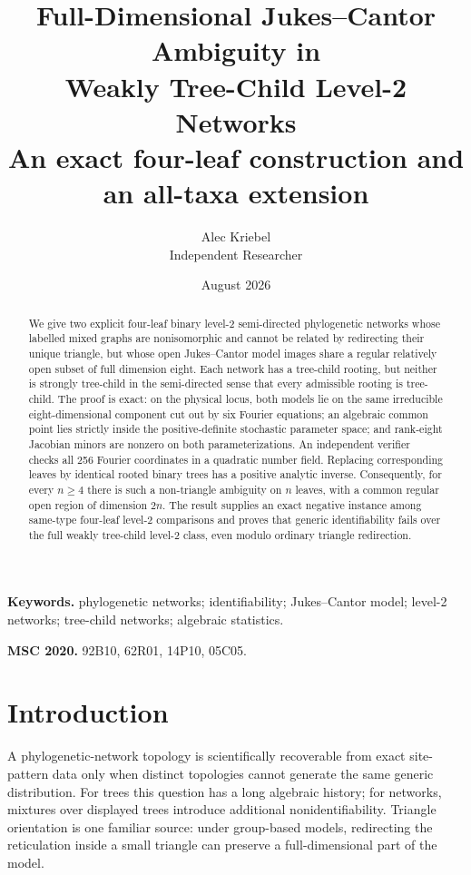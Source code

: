 \documentclass[11pt]{article}
\title{Full-Dimensional Jukes--Cantor Ambiguity in\\
Weakly Tree-Child Level-2 Networks\\
\large An exact four-leaf construction and an all-taxa extension}
\author{Alec Kriebel\\\small Independent Researcher}
\date{August 2026}
\theoremstyle{remark}
\begin{document}
\maketitle

\begin{abstract}
We give two explicit four-leaf binary level-2 semi-directed phylogenetic
networks whose labelled mixed graphs are nonisomorphic and cannot be related
by redirecting their unique triangle, but whose open Jukes--Cantor model
images share a regular relatively open subset of full dimension eight.  Each
network has a tree-child rooting, but neither is strongly tree-child in the
semi-directed sense that every admissible rooting is tree-child.  The proof is
exact: on the physical locus, both models lie on the same irreducible
eight-dimensional component cut out by six Fourier equations; an algebraic
common point lies
strictly inside the positive-definite stochastic parameter space; and
rank-eight Jacobian minors are nonzero on both parameterizations.  An
independent verifier checks all 256 Fourier coordinates in a quadratic number
field.  Replacing corresponding leaves by identical rooted binary trees has
a positive analytic inverse.  Consequently, for every $n\ge4$ there is such
a non-triangle ambiguity on $n$ leaves, with a common regular open region of
dimension $2n$.  The result supplies an exact negative instance among
same-type four-leaf level-2 comparisons and proves that generic identifiability
fails over the full weakly tree-child level-2 class, even modulo ordinary
triangle redirection.
\end{abstract}

\noindent\textbf{Keywords.} phylogenetic networks; identifiability;
Jukes--Cantor model; level-2 networks; tree-child networks; algebraic
statistics.

\medskip
\noindent\textbf{MSC 2020.} 92B10, 62R01, 14P10, 05C05.

\section{Introduction}

A phylogenetic-network topology is scientifically recoverable from exact
site-pattern data only when distinct topologies cannot generate the same
generic distribution.  For trees this question has a long algebraic history;
for networks, mixtures over displayed trees introduce additional
nonidentifiability.  Triangle orientation is one familiar source: under
group-based models, redirecting the reticulation inside a small triangle can
preserve a full-dimensional part of the model.
\end{document}

